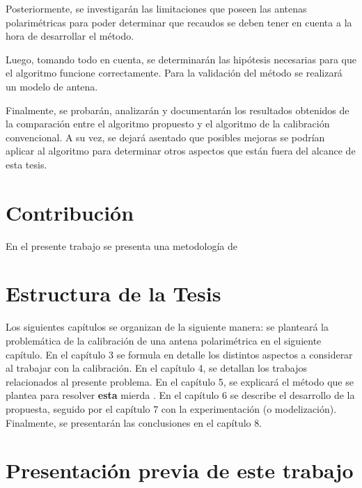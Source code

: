 Posteriormente, se investigarán las limitaciones que poseen las antenas polarimétricas para poder determinar que recaudos 
se deben tener en cuenta a la hora de desarrollar el método.

Luego, tomando todo en cuenta, se determinarán las hipótesis necesarias para que el algoritmo funcione correctamente. Para 
la validación del método se realizará un modelo de antena.

Finalmente, se probarán, analizarán y documentarán los resultados obtenidos de la comparación entre el algoritmo propuesto 
y el algoritmo de la calibración convencional. A su vez, se dejará asentado que posibles mejoras se podrían aplicar al 
algoritmo para determinar otros aspectos que están fuera del alcance de esta tesis.



\section{Contribución}

En el presente trabajo se presenta una metodología de 


\section{Estructura de la Tesis}

Los siguientes capítulos se organizan de la siguiente manera: se planteará la problemática de la calibración de una antena
polarimétrica en el siguiente capítulo. En el capítulo 3 se formula en detalle los distintos aspectos a considerar al 
trabajar con la calibración. En el capítulo 4, se detallan los trabajos relacionados al presente problema. En el capítulo 5,
se explicará el método que se plantea para resolver \textbf{esta} mierda . En el capítulo 6 se 
describe el desarrollo de la propuesta, seguido por el capítulo 7 con la experimentación (o modelización). Finalmente, se presentarán las 
conclusiones en el capítulo 8.

\section{Presentación previa de este trabajo}


